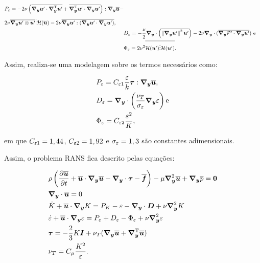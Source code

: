 \begin{subequations}
    \begin{align}
        \begin{split}
            & P_\ep=-2\nu\bigpar{\bar{\Ny\BB{u}'\cdot\NyT\BB{u}'}+\bar{\NyT\BB{u}'\cdot\Ny\BB{u}'}}:\Ny\BBB{u}-\\
            &2\nu\bar{\Ny\BB{u}'\otimes\BB{u}'}\vdots\script{H}(\BBB{u})-2\nu\bar{\Ny\BB{u}':(\Ny\BB{u}'\cdot\Ny\BB{u}')} \text{,}
        \end{split} \\
         & D_\ep=-\frac{\nu}{2}\Ny\cdot\bigpar{\bar{\norm{\Ny\BB{u}'}^2\BB{u}'}}-2\nu\Ny\cdot(\bar{\Ny\pr'\cdot\Ny\BB{u}'}) \text{ e}                                                                              \\
         & \Phi_\ep=2\nu^2\bar{\script{H}(\BB{u}')\vdots\script{H}(\BB{u}')}\text{.}
    \end{align}
\end{subequations}

Assim, realiza-se uma modelagem sobre os termos necessários como:

\begin{subequations}
    \begin{align}
         & P_\ep=C_{\ep 1}\frac{\ep}{k}\btau:\Ny\BBB{u}\text{,}          \\
         & D_\ep=\Ny\cdot\bigpar{\frac{\nu_T}{\sigma_\ep}\Ny\ep}\text{e} \\
         & \Phi_\ep=C_{\ep 2}\frac{\ep^2}{K}\text{,}
    \end{align}
\end{subequations}

\noindent em que $C_{\ep 1}=1,44$, $C_{\ep 2}=1,92$ e $\sigma_\ep=1,3$ são constantes adimensionais.

Assim, o problema RANS fica descrito pelas equações:

\begin{subequations}
    \begin{align}
         & \rho\bigpar{\dvt{\BBB{u}}+\BBB{u}\cdot\Ny\BBB{u}-\Ny\cdot\btau-\BBB{f}}-\mu\Lapl\BBB{u}+\Ny\bar{p}=\BB{0} \\
         & \Ny\cdot\BBB{u}=0                                                                                         \\
         & \dot{K}+\BBB{u}\cdot\Ny K=P_K-\varepsilon-\Ny\cdot\BB{D}+\nu\Lapl K                                       \\
         & \dot{\varepsilon}+\BBB{u}\cdot\Ny\ep=P_\ep+D_\ep-\Phi_\ep+\nu\Lapl\ep                                     \\
         & \btau=-\frac{2}{3}K\BB{I}+\nu_T(\Ny\BBB{u}+\NyT\BBB{u})                                                   \\
         & \nu_T=C_\mu\frac{K^2}{\ep}\text{.}
    \end{align}
\end{subequations}